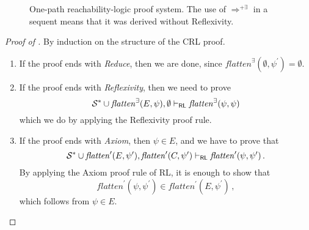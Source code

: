 \begin{figure}
    \caption{One-path reachability-logic proof system.
    The use of $\Rightarrow^{+ \exists}$ in a sequent means that it was derived without Reflexivity.}
    \label{fig:RLproofsystem}
\end{figure}

\begin{proof}[Proof of ]
By induction on the structure of the CRL proof.
\begin{enumerate}
    \item If the proof ends with \emph{Reduce}, then we are done, since $\mathit{flatten}^\exists(\emptyset, \psi^\prime) = \emptyset$.
    
    \item If the proof ends with \emph{Reflexivity}, then we need to prove
    \begin{equation*}
        \mathcal{S}^* \cup \mathit{flatten}^\exists(E, \psi), \emptyset \vdash_{\mathsf{RL}}
          \mathit{flatten}^\exists(\psi, \psi) 
    \end{equation*}
    which we do by applying the Reflexivity proof rule.
    
    \item If the proof ends with \emph{Axiom}, then $\psi \in E$,
          and we have to prove that
          \begin{equation*}
            \mathcal{S}^* \cup \mathit{flatten}^\prime(E, \psi^\prime), \mathit{flatten}^\prime(C, \psi^\prime) \vdash_{\mathsf{RL}}
            \mathit{flatten}^\prime(\psi, \psi^\prime)               \, .
          \end{equation*}
          By applying the Axiom proof rule of RL, it is enough to show that
          \begin{equation*}
              \mathit{flatten}^\prime(\psi, \psi^\prime) \in \mathit{flatten^\prime}(E, \psi^\prime) \, ,
          \end{equation*}
          which follows from $\psi \in E$.
          

\end{enumerate}
\end{proof}
